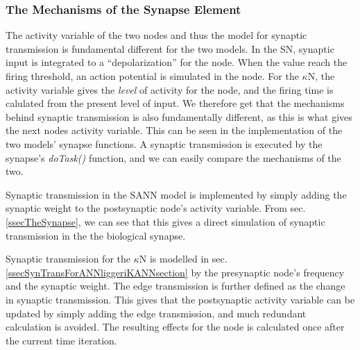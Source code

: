 		\subsubsection{The Mechanisms of the Synapse Element}
		The activity variable of the two nodes and thus the model for synaptic transmission is fundamental different for the two models.
		In the SN, synaptic input is integrated to a ``depolarization'' for the node.
		When the value reach the firing threshold, an action potential is simulated in the node.
		For the $\kappa$N, the activity variable gives the \emph{level} of activity for the node, and the firing time is calulated from the present level of input.
		We therefore get that the mechanisms behind synaptic transmission is also fundamentally different, as this is what gives the next nodes activity variable. %
		This can be seen in the implementation of the two models' synapse functions. 
		A synaptic transmission is executed by the synapse's \emph{doTask()} function, and we can easily compare the mechanisms of the two.

		Synaptic transmission in the SANN model is implemented by simply adding the synaptic weight to the postsynaptic node's activity variable.
		From sec. \ref{ssecTheSynapse}, we can see that this gives a direct simulation of synaptic transmission in the the biological synapse.

		Synaptic transmission for the $\kappa$N is modelled in sec. \ref{ssecSynTransForANNliggeriKANNsection} by the presynaptic node's frequency and the synaptic weight.
		The edge transmission is further defined as the change in synaptic transmission. %
		This gives that the postsynaptic activity variable can be updated by simply adding the edge transmission, and much redundant calculation is avoided.
		The resulting effects for the node is calculated once after the current time iteration.

